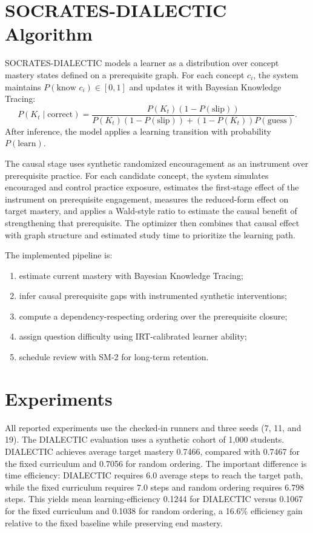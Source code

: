 \documentclass[conference]{IEEEtran}
\begin{document}
\section{SOCRATES-DIALECTIC Algorithm}
SOCRATES-DIALECTIC models a learner as a distribution over concept mastery states defined on a prerequisite graph. For each concept $c_i$, the system maintains $P(\text{know } c_i)\in[0,1]$ and updates it with Bayesian Knowledge Tracing:
\begin{equation}
P(K_t \mid \text{correct}) = \frac{P(K_t)(1-P(\text{slip}))}{P(K_t)(1-P(\text{slip})) + (1-P(K_t))P(\text{guess})}.
\end{equation}
After inference, the model applies a learning transition with probability $P(\text{learn})$.

The causal stage uses synthetic randomized encouragement as an instrument over prerequisite practice. For each candidate concept, the system simulates encouraged and control practice exposure, estimates the first-stage effect of the instrument on prerequisite engagement, measures the reduced-form effect on target mastery, and applies a Wald-style ratio to estimate the causal benefit of strengthening that prerequisite. The optimizer then combines that causal effect with graph structure and estimated study time to prioritize the learning path.

The implemented pipeline is:
\begin{enumerate}
\item estimate current mastery with Bayesian Knowledge Tracing;
\item infer causal prerequisite gaps with instrumented synthetic interventions;
\item compute a dependency-respecting ordering over the prerequisite closure;
\item assign question difficulty using IRT-calibrated learner ability;
\item schedule review with SM-2 for long-term retention.
\end{enumerate}

\section{Experiments}
All reported experiments use the checked-in runners and three seeds (7, 11, and 19). The DIALECTIC evaluation uses a synthetic cohort of 1{,}000 students. DIALECTIC achieves average target mastery 0.7466, compared with 0.7467 for the fixed curriculum and 0.7056 for random ordering. The important difference is time efficiency: DIALECTIC requires 6.0 average steps to reach the target path, while the fixed curriculum requires 7.0 steps and random ordering requires 6.798 steps. This yields mean learning-efficiency 0.1244 for DIALECTIC versus 0.1067 for the fixed curriculum and 0.1038 for random ordering, a 16.6\% efficiency gain relative to the fixed baseline while preserving end mastery.
\end{document}
